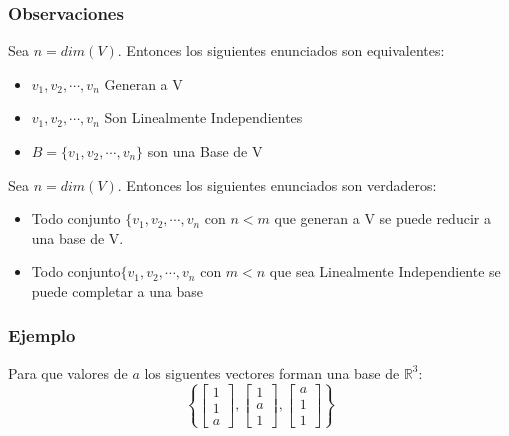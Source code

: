 \documentclass[12pt]{report}                                %
\begin{document}
        \subsubsection{Observaciones}
        Sea $n = dim(V)$. Entonces los siguientes enunciados son equivalentes:
        \begin{itemize}
            \item $v_1, v_2, \cdots ,v_n$ Generan a V
            \item $v_1, v_2, \cdots ,v_n$ Son Linealmente Independientes
            \item $B = \{ v_1, v_2, \cdots ,v_n \}$ son una Base de V
        \end{itemize}

        Sea $n = dim(V)$. Entonces los siguientes enunciados son verdaderos:
        \begin{itemize}
            \item Todo conjunto $\{ v_1, v_2, \cdots ,v_n$ con $n < m$ que generan a V
            se puede reducir a una base de V.

            \item Todo conjunto$\{ v_1, v_2, \cdots ,v_n$ con $m < n$ que sea Linealmente
            Independiente se puede completar a una base
        \end{itemize}

        \subsubsection{Ejemplo}

            Para que valores de $a$ los siguentes vectores forman una base de $\mathbb{R}^3$:
            \begin{equation*}
                \left\{
                    \begin{bmatrix} 1 \\ 1 \\ a \end{bmatrix},
                    \begin{bmatrix} 1 \\ a \\ 1 \end{bmatrix},
                    \begin{bmatrix} a \\ 1 \\ 1 \end{bmatrix} 
                \right\}
            \end{equation*}
\end{document}
